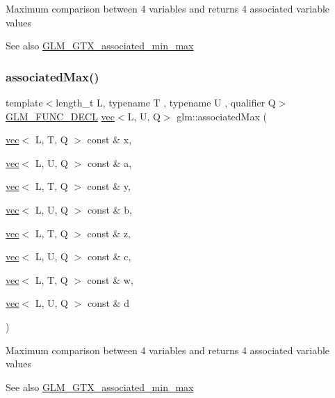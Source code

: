 Maximum comparison between 4 variables and returns 4 associated variable values \begin{DoxySeeAlso}{See also}
\mbox{\hyperlink{group__gtx__associated__min__max}{G\+L\+M\+\_\+\+G\+T\+X\+\_\+associated\+\_\+min\+\_\+max}} 
\end{DoxySeeAlso}
\mbox{\label{group__gtx__associated__min__max_gaf5ab0c428f8d1cd9e3b45fcfbf6423a6}} 
\subsubsection{\texorpdfstring{associated\+Max()}{associatedMax()}\hspace{0.1cm}{\footnotesize\ttfamily [10/12]}}
{\footnotesize\ttfamily template$<$length\+\_\+t L, typename T , typename U , qualifier Q$>$ \\
\mbox{\hyperlink{setup_8hpp_ab2d052de21a70539923e9bcbf6e83a51}{G\+L\+M\+\_\+\+F\+U\+N\+C\+\_\+\+D\+E\+CL}} \mbox{\hyperlink{structglm_1_1vec}{vec}}$<$L, U, Q$>$ glm\+::associated\+Max (\begin{DoxyParamCaption}\item[{\mbox{\hyperlink{structglm_1_1vec}{vec}}$<$ L, T, Q $>$ const \&}]{x,  }\item[{\mbox{\hyperlink{structglm_1_1vec}{vec}}$<$ L, U, Q $>$ const \&}]{a,  }\item[{\mbox{\hyperlink{structglm_1_1vec}{vec}}$<$ L, T, Q $>$ const \&}]{y,  }\item[{\mbox{\hyperlink{structglm_1_1vec}{vec}}$<$ L, U, Q $>$ const \&}]{b,  }\item[{\mbox{\hyperlink{structglm_1_1vec}{vec}}$<$ L, T, Q $>$ const \&}]{z,  }\item[{\mbox{\hyperlink{structglm_1_1vec}{vec}}$<$ L, U, Q $>$ const \&}]{c,  }\item[{\mbox{\hyperlink{structglm_1_1vec}{vec}}$<$ L, T, Q $>$ const \&}]{w,  }\item[{\mbox{\hyperlink{structglm_1_1vec}{vec}}$<$ L, U, Q $>$ const \&}]{d }\end{DoxyParamCaption})}

Maximum comparison between 4 variables and returns 4 associated variable values \begin{DoxySeeAlso}{See also}
\mbox{\hyperlink{group__gtx__associated__min__max}{G\+L\+M\+\_\+\+G\+T\+X\+\_\+associated\+\_\+min\+\_\+max}} 
\end{DoxySeeAlso}
\mbox{\label{group__gtx__associated__min__max_ga11477c2c4b5b0bfd1b72b29df3725a9d}} 
